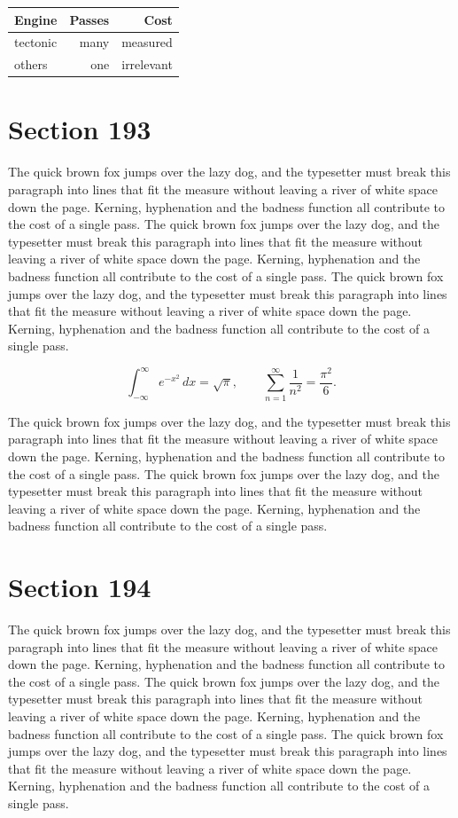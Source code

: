 \documentclass{article}
\begin{document}
\begin{center}
\begin{tabular}{lrr}
\toprule
Engine & Passes & Cost \\
\midrule
tectonic & many & measured \\
others & one & irrelevant \\
\bottomrule
\end{tabular}
\end{center}

\section{Section 193}
The quick brown fox jumps over the lazy dog, and the typesetter must break this paragraph into lines that fit the measure without leaving a river of white space down the page. Kerning, hyphenation and the badness function all contribute to the cost of a single pass. The quick brown fox jumps over the lazy dog, and the typesetter must break this paragraph into lines that fit the measure without leaving a river of white space down the page. Kerning, hyphenation and the badness function all contribute to the cost of a single pass. The quick brown fox jumps over the lazy dog, and the typesetter must break this paragraph into lines that fit the measure without leaving a river of white space down the page. Kerning, hyphenation and the badness function all contribute to the cost of a single pass. 

\begin{equation}
\int_{-\infty}^{\infty} e^{-x^{2}}\,dx = \sqrt{\pi}, \qquad
\sum_{n=1}^{\infty} \frac{1}{n^{2}} = \frac{\pi^{2}}{6}.
\end{equation}

The quick brown fox jumps over the lazy dog, and the typesetter must break this paragraph into lines that fit the measure without leaving a river of white space down the page. Kerning, hyphenation and the badness function all contribute to the cost of a single pass. The quick brown fox jumps over the lazy dog, and the typesetter must break this paragraph into lines that fit the measure without leaving a river of white space down the page. Kerning, hyphenation and the badness function all contribute to the cost of a single pass. 
\section{Section 194}
The quick brown fox jumps over the lazy dog, and the typesetter must break this paragraph into lines that fit the measure without leaving a river of white space down the page. Kerning, hyphenation and the badness function all contribute to the cost of a single pass. The quick brown fox jumps over the lazy dog, and the typesetter must break this paragraph into lines that fit the measure without leaving a river of white space down the page. Kerning, hyphenation and the badness function all contribute to the cost of a single pass. The quick brown fox jumps over the lazy dog, and the typesetter must break this paragraph into lines that fit the measure without leaving a river of white space down the page. Kerning, hyphenation and the badness function all contribute to the cost of a single pass. 
\end{document}
